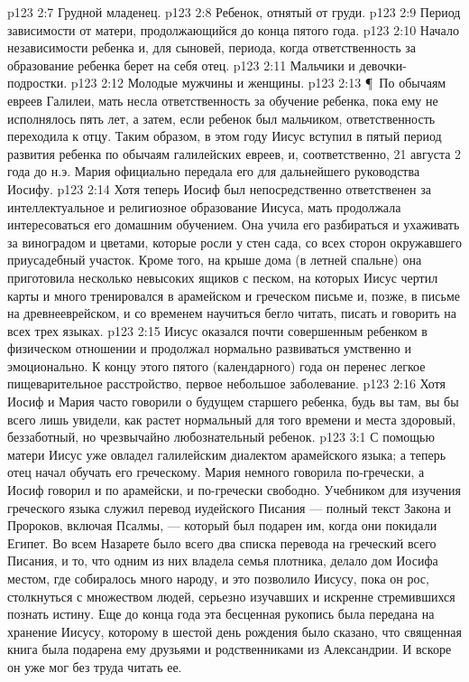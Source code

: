 \vs p123 2:7 \bibnobreakspace Грудной младенец.
\vs p123 2:8 \bibnobreakspace Ребенок, отнятый от груди.
\vs p123 2:9 \bibnobreakspace Период зависимости от матери, продолжающийся до конца пятого года.
\vs p123 2:10 \bibnobreakspace Начало независимости ребенка и, для сыновей, периода, когда ответственность за образование ребенка берет на себя отец.
\vs p123 2:11 \bibnobreakspace Мальчики и девочки\hyp{}подростки.
\vs p123 2:12 \bibnobreakspace Молодые мужчины и женщины.
\vs p123 2:13 \P\ По обычаям евреев Галилеи, мать несла ответственность за обучение ребенка, пока ему не исполнялось пять лет, а затем, если ребенок был мальчиком, ответственность переходила к отцу. Таким образом, в этом году Иисус вступил в пятый период развития ребенка по обычаям галилейских евреев, и, соответственно, 21 августа 2 года до н.э. Мария официально передала его для дальнейшего руководства Иосифу.
\vs p123 2:14 Хотя теперь Иосиф был непосредственно ответственен за интеллектуальное и религиозное образование Иисуса, мать продолжала интересоваться его домашним обучением. Она учила его разбираться и ухаживать за виноградом и цветами, которые росли у стен сада, со всех сторон окружавшего приусадебный участок. Кроме того, на крыше дома (в летней спальне) она приготовила несколько невысоких ящиков с песком, на которых Иисус чертил карты и много тренировался в арамейском и греческом письме и, позже, в письме на древнееврейском, и со временем научиться бегло читать, писать и говорить на всех трех языках.
\vs p123 2:15 Иисус оказался почти совершенным ребенком в физическом отношении и продолжал нормально развиваться умственно и эмоционально. К концу этого пятого (календарного) года он перенес легкое пищеварительное расстройство, первое небольшое заболевание.
\vs p123 2:16 Хотя Иосиф и Мария часто говорили о будущем старшего ребенка, будь вы там, вы бы всего лишь увидели, как растет нормальный для того времени и места здоровый, беззаботный, но чрезвычайно любознательный ребенок.
\vs p123 3:1 С помощью матери Иисус уже овладел галилейским диалектом арамейского языка; а теперь отец начал обучать его греческому. Мария немного говорила по\hyp{}гречески, а Иосиф говорил и по арамейски, и по\hyp{}гречески свободно. Учебником для изучения греческого языка служил перевод иудейского Писания --- полный текст Закона и Пророков, включая Псалмы, --- который был подарен им, когда они покидали Египет. Во всем Назарете было всего два списка перевода на греческий всего Писания, и то, что одним из них владела семья плотника, делало дом Иосифа местом, где собиралось много народу, и это позволило Иисусу, пока он рос, столкнуться с множеством людей, серьезно изучавших и искренне стремившихся познать истину. Еще до конца года эта бесценная рукопись была передана на хранение Иисусу, которому в шестой день рождения было сказано, что священная книга была подарена ему друзьями и родственниками из Александрии. И вскоре он уже мог без труда читать ее.
